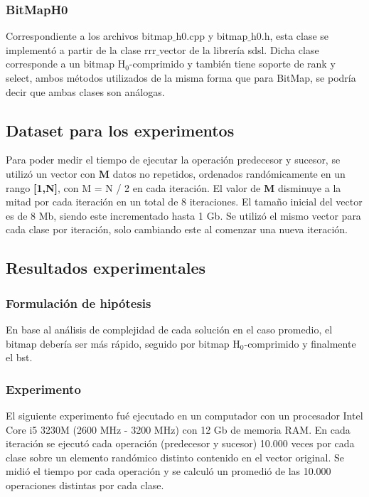 \documentclass[11pt]{article}
\begin{document}
\subsubsection{BitMapH0}
Correspondiente a los archivos bitmap$\_$h0.cpp y bitmap$\_$h0.h, esta clase se implementó a partir de la clase rrr$\_$vector de la librería sdsl. Dicha clase corresponde a un bitmap H$_{0}$-comprimido y también tiene soporte de rank y select, ambos métodos utilizados de la misma forma que para BitMap, se podría decir que ambas clases son análogas.
\subsection{Dataset para los experimentos}
Para poder medir el tiempo de ejecutar la operación predecesor y sucesor, se utilizó un vector con \textbf{M} datos no repetidos, ordenados randómicamente en un rango \textbf{[1,N]}, con M = N / 2 en cada iteración. El valor de \textbf{M} disminuye a la mitad por cada iteración en un total de 8 iteraciones. El tamaño inicial del vector es de 8 Mb, siendo este incrementado hasta 1 Gb. Se utilizó el mismo vector para cada clase por iteración, solo cambiando este al comenzar una nueva iteración.
\subsection{Resultados experimentales}
\subsubsection{Formulación de hipótesis}
En base al análisis de complejidad de cada solución en el caso promedio, el bitmap debería ser más rápido, seguido por bitmap H$_{0}$-comprimido y finalmente el bst. 
\subsubsection{Experimento}
El siguiente experimento fué ejecutado en un computador con un procesador Intel Core i5 3230M (2600 MHz - 3200 MHz) con 12 Gb de memoria RAM. En cada iteración se ejecutó cada operación (predecesor y sucesor) 10.000 veces por cada clase sobre un elemento randómico distinto contenido en el vector original. Se midió el tiempo por cada operación y se calculó un promedió de las 10.000 operaciones distintas por cada clase.
\end{document}
